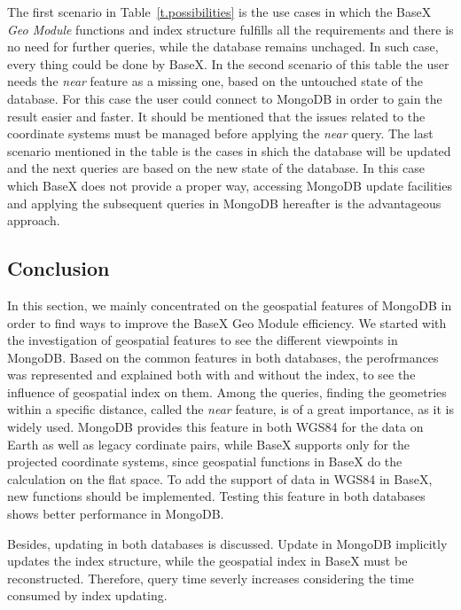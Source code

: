 \documentclass[a4paper,12pt]{article}
\begin{document}
The first scenario in Table~\ref{t.possibilities} is the use cases in which the BaseX \textit{Geo Module} functions and index structure fulfills all the requirements and there is no need for further queries, while the database remains unchaged. In such case, every thing could be done by BaseX. In the second scenario of this table the user needs the \textit{near} feature as a missing one, based on the untouched state of the database. For this case the user could connect to MongoDB in order to gain the result easier and faster. It should be mentioned that the issues related to the coordinate systems must be managed before applying the \textit{near} query. The last scenario mentioned in the table is the cases in shich the database will be updated and the next queries are based on the new state of the database. In this case which BaseX does not provide a proper way, accessing MongoDB update facilities and applying the subsequent queries in MongoDB hereafter is the advantageous approach. 

\subsection{Conclusion}
\label{conc}
In this section, we mainly concentrated on the geospatial features of MongoDB in order to find ways to improve the BaseX Geo Module efficiency. We started with the investigation of geospatial features to see the different viewpoints in MongoDB. Based on the common features in both databases, the perofrmances was represented and explained both with and without the index, to see the influence of geospatial index on them.
Among the queries, finding the geometries within a specific distance, called the \textit{near} feature, is of a great importance, as it is widely used. MongoDB provides this feature in both WGS84 for the data on Earth as well as legacy cordinate pairs, while BaseX supports only for the projected coordinate systems, since geospatial functions in BaseX do the calculation on the flat space. To add the support of data in WGS84 in BaseX, new functions should be implemented. Testing this feature in both databases shows better performance in MongoDB. 

Besides, updating in both databases is discussed. Update in MongoDB implicitly updates the index structure, while the geospatial index in BaseX must be reconstructed. Therefore, query time severly increases considering the time consumed by index updating. 
\end{document}
